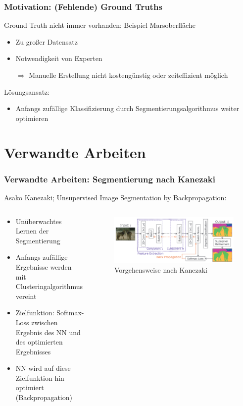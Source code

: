 \documentclass[9pt]{beamer}
\newenvironment{myframe}[1][]{%
	\begin{frame}%
		\frametitle{#1}
		\setcounter{footnote}{0}
		
		
	}{%
	\end{frame}%
}
\begin{document}
\begin{myframe}[Motivation: (Fehlende) Ground Truths]
Ground Truth nicht immer vorhanden: Beispiel Marsoberfläche
\begin{itemize}
	\item Zu großer Datensatz
	\item Notwendigkeit von Experten
	\item[$\Rightarrow$] Manuelle Erstellung nicht kostengünstig oder zeiteffizient möglich
\end{itemize}
\medskip
Lösungsansatz:
\begin{itemize}
	\item Anfangs zufällige Klassifizierung durch Segmentierungsalgorithmus weiter optimieren
\end{itemize}
\end{myframe}

\section{Verwandte Arbeiten}

\begin{myframe}[Verwandte Arbeiten: Segmentierung nach Kanezaki\cite{kanezaki2018_unsupervised_segmentation}]
Asako Kanezaki; Unsupervised Image Segmentation by Backpropagation\cite{kanezaki2018_unsupervised_segmentation}:
\begin{columns}
	\begin{column}{.5\textwidth}
		\begin{itemize}
			\item Unüberwachtes Lernen der Segmentierung
			\item Anfangs zufällige Ergebnisse werden mit Clusteringalgorithmus vereint
			\item Zielfunktion: Softmax-Loss zwischen Ergebnis des NN und des optimierten Ergebnisses
			\item NN wird auf diese Zielfunktion hin optimiert (Backpropagation)
		\end{itemize}
	\end{column}
	\begin{column}{.5\textwidth}
		\begin{figure}
			\includegraphics[width=\textwidth,keepaspectratio]{kanezaki.png}
			\caption{Vorgehensweise nach Kanezaki\cite{kanezaki2018_unsupervised_segmentation}}
		\end{figure}
	\end{column}
\end{columns}
\end{myframe}
\end{document}
